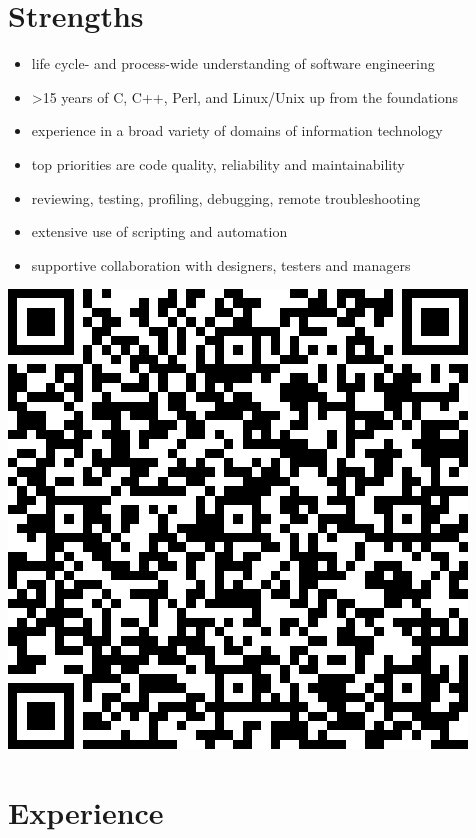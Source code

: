 \documentclass[a4paper,12pt]{article}
\newcommand{\compress}{\setlength\itemsep{-\parskip}}
\newenvironment{compressedItemize}{\begin{itemize}\compress}{\end{itemize}}
\begin{document}
\section{Strengths}

\begin{minipage}[b]{0.82\textwidth}
\begin{compressedItemize}
\item	life cycle- and process-wide understanding of software engineering
\item	>15 years of C, C++, Perl, and Linux/Unix up from the foundations
\item	experience in a broad variety of domains of information technology
\item	top priorities are code quality, reliability and maintainability
\item	reviewing, testing, profiling, debugging, remote troubleshooting
\item	extensive use of scripting and automation
\item	supportive collaboration with designers, testers and managers
\end{compressedItemize}
\end{minipage}
\parbox[t]{0.18\textwidth}{\includegraphics[scale=0.28,clip=false]{qrcode}}

\section{Experience}
\end{document}
